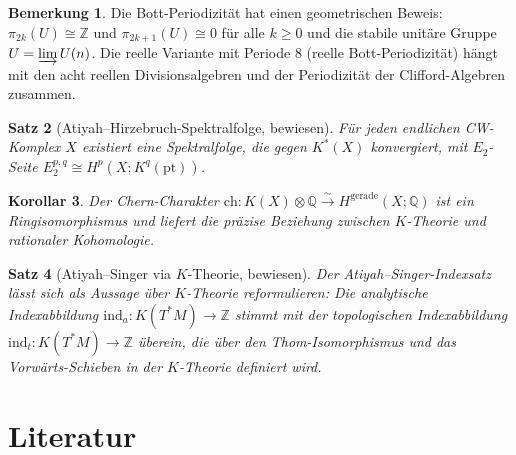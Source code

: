 \documentclass[12pt,a4paper]{amsart}
\newtheorem{theorem}{Satz}[section]
\newtheorem{corollary}[theorem]{Korollar}
\theoremstyle{definition}
\newtheorem{remark}[theorem]{Bemerkung}
\begin{document}
\begin{remark}
Die Bott-Periodizität hat einen geometrischen Beweis: $\pi_{2k}(U) \cong \mathbb{Z}$
und $\pi_{2k+1}(U) \cong 0$ für alle $k \ge 0$ und die stabile unitäre Gruppe
$U = \varinjlim U(n)$. Die reelle Variante mit Periode $8$ (reelle Bott-Periodizität)
hängt mit den acht reellen Divisionsalgebren und der Periodizität der
Clifford-Algebren zusammen.
\end{remark}

\begin{theorem}[Atiyah--Hirzebruch-Spektralfolge, bewiesen]
\label{thm:ahss}
Für jeden endlichen CW-Komplex $X$ existiert eine Spektralfolge, die gegen
$K^*(X)$ konvergiert, mit $E_2$-Seite
$E_2^{p,q} \cong H^p(X; K^q(\mathrm{pt}))$.
\end{theorem}

\begin{corollary}
Der Chern-Charakter $\mathrm{ch} \colon K(X) \otimes \mathbb{Q} \xrightarrow{\sim}
H^{\mathrm{gerade}}(X; \mathbb{Q})$ ist ein Ringisomorphismus und liefert die
präzise Beziehung zwischen $K$-Theorie und rationaler Kohomologie.
\end{corollary}

\begin{theorem}[Atiyah--Singer via $K$-Theorie, bewiesen]
Der Atiyah--Singer-Indexsatz lässt sich als Aussage über $K$-Theorie
reformulieren: Die analytische Indexabbildung $\mathrm{ind}_a \colon K(T^*M)
\to \mathbb{Z}$ stimmt mit der topologischen Indexabbildung
$\mathrm{ind}_t \colon K(T^*M) \to \mathbb{Z}$ überein, die über den
Thom-Isomorphismus und das Vorwärts-Schieben in der $K$-Theorie definiert wird.
\end{theorem}

\section{Literatur}
\end{document}
